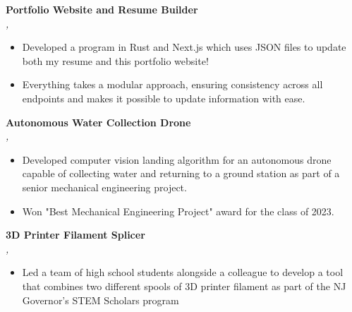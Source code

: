 \documentclass[a4paper]{article}
\begin{document}
            {\textbf{Portfolio Website and Resume Builder}}\\
            \textit{, }
            \vspace{-1mm}
            \begin{itemize} \itemsep 1pt
            
                    \item Developed a program in Rust and Next.js which uses JSON files to update both my resume and this portfolio website!
                
                    \item Everything takes a modular approach, ensuring consistency across all endpoints and makes it possible to update information with ease.
                
            \end{itemize}
            \vspace*{2mm}
            
            {\textbf{Autonomous Water Collection Drone}}\\
            \textit{, }
            \vspace{-1mm}
            \begin{itemize} \itemsep 1pt
            
                    \item Developed computer vision landing algorithm for an autonomous drone capable of collecting water and returning to a ground station as part of a senior mechanical engineering project.
                
                    \item Won "Best Mechanical Engineering Project" award for the class of 2023.
                
            \end{itemize}
            \vspace*{2mm}
            
            {\textbf{3D Printer Filament Splicer}}\\
            \textit{, }
            \vspace{-1mm}
            \begin{itemize} \itemsep 1pt
            
                    \item Led a team of high school students alongside a colleague to develop a tool that combines two different spools of 3D printer filament as part of the NJ Governor’s STEM Scholars program
                
            \end{itemize}
            \vspace*{2mm}
            
\end{document}
